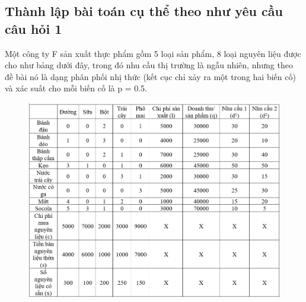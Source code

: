 \documentclass[a4paper]{article}
\begin{document}
        \subsection{Thành lập bài toán cụ thể theo như yêu cầu câu hỏi 1}

        Một công ty F sản xuất thực phẩm gồm 5 loại sản phẩm, 8 loại nguyên liệu được cho như bảng dưới đây, trong đó nhu cầu thị trường là ngẫu nhiên, nhưng theo đề bài nó là dạng phân phối nhị thức (kết cục chỉ xảy ra một trong hai biến cố) và xác suất cho mỗi biến cố là p = 0.5.
        \begin{figure}[!ht]
            \centering
            \includegraphics[width=1\linewidth]{tab1.png}
        \end{figure}
\end{document}
